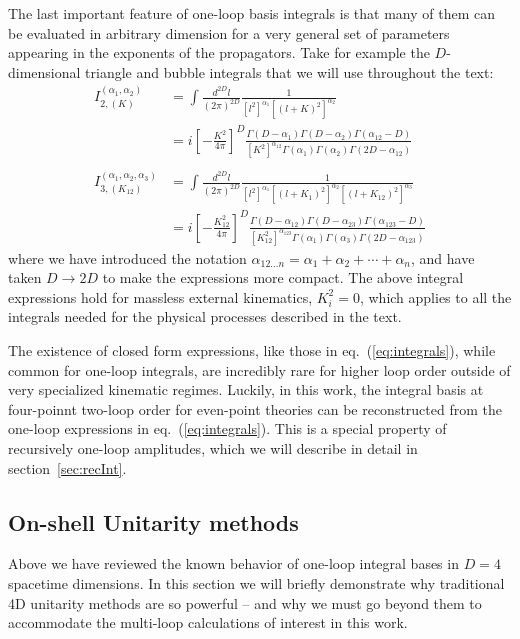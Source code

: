 \documentclass[12pt,letter]{article}
\def\sect#1{section~\ref{#1}}
\def\eqn#1{eq.~(\ref{#1})}
\def\be{\begin{equation}}
\def\ee{\end{equation}}
\begin{document}
The last important feature of one-loop basis integrals is that many of them can be evaluated in arbitrary dimension for a very general set of parameters appearing in the exponents of the propagators. Take for example the $D$-dimensional triangle and bubble integrals that we will use throughout the text:
\be\label{eq:integrals}
\boxed{
\begin{aligned}
I_{2,(K)}^{(\alpha_1,\alpha_2)}&=\int \frac{d^{2D} l}{(2\pi)^{2D}} \frac{1}{[l^2]^{\alpha_1}[(l+K)^2]^{\alpha_2}} 
\\
&=i\left[-\frac{K^2}{4\pi}\right]^D\frac{\Gamma(D-\alpha_1)\Gamma(D-\alpha_2)\Gamma(\alpha_{12}-D)}{[K^2]^{\alpha_{12}}\Gamma(\alpha_1)\Gamma(\alpha_2)\Gamma(2D-\alpha_{12})} 
 \\\\
I_{3,(K_{12})}^{(\alpha_1,\alpha_2,\alpha_3)}&= \int \frac{d^{2D} l}{(2\pi)^{2D}} \frac{1}{[l^2]^{\alpha_1}[(l+K_1)^2]^{\alpha_2}[(l+K_{12})^2]^{\alpha_3}} 
\\
&=i\left[-\frac{K_{12}^2}{4\pi}\right]^D\frac{\Gamma(D-\alpha_{12})\Gamma(D-\alpha_{23})\Gamma(\alpha_{123}-D)}{[K_{12}^2]^{\alpha_{123}}\Gamma(\alpha_1)\Gamma(\alpha_3)\Gamma(2D-\alpha_{123})} 
\end{aligned}
}
\ee
where we have introduced the notation $\alpha_{12...n} = \alpha_1+\alpha_2+\cdots +\alpha_n$, and have taken $D\rightarrow 2D$ to make the expressions more compact. The above integral expressions hold for massless external kinematics, $K_i^2=0$, which applies to all the integrals needed for the physical processes described in the text. 

The existence of closed form expressions, like those in \eqn{eq:integrals}, while common for one-loop integrals, are incredibly rare for higher loop order outside of very specialized kinematic regimes. Luckily, in this work, the integral basis at four-poinnt two-loop order for even-point theories can be reconstructed from the one-loop expressions in \eqn{eq:integrals}. This is a special property of recursively one-loop amplitudes, which we will describe in detail in \sect{sec:recInt}.
\subsection{On-shell Unitarity methods}\label{sec:genU}
Above we have reviewed the known behavior of one-loop integral bases in $D=4$ spacetime dimensions. In this section we will briefly demonstrate why traditional 4D unitarity methods are so powerful -- and why we must go beyond them to accommodate the multi-loop calculations of interest in this work. 
\end{document}
